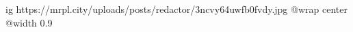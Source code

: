  
 
 
 
 

\ifcmt
  ig https://mrpl.city/uploads/posts/redactor/3ncvy64uwfb0fvdy.jpg
  @wrap center
  @width 0.9
\fi
